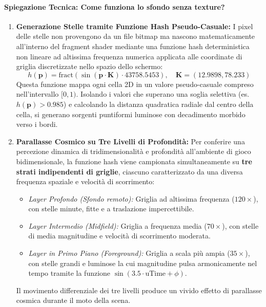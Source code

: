 \documentclass[11pt,a4paper]{article}
\begin{document}
\paragraph{Spiegazione Tecnica: Come funziona lo sfondo senza texture?}
\begin{enumerate}
    \item \textbf{Generazione Stelle tramite Funzione Hash Pseudo-Casuale:}
    I pixel delle stelle non provengono da un file bitmap ma nascono matematicamente all'interno del fragment shader mediante una funzione hash deterministica non lineare ad altissima frequenza numerica applicata alle coordinate di griglia discretizzate nello spazio dello schermo:
    \begin{equation}
    h(\mathbf{p}) = \text{fract}\left(\sin(\mathbf{p} \cdot \mathbf{K}) \cdot 43758.5453\right), \quad \mathbf{K} = (12.9898, 78.233)
    \end{equation}
    Questa funzione mappa ogni cella 2D in un valore pseudo-casuale compreso nell'intervallo $[0, 1)$. Isolando i valori che superano una soglia selettiva (es. $h(\mathbf{p}) > 0.985$) e calcolando la distanza quadratica radiale dal centro della cella, si generano sorgenti puntiformi luminose con decadimento morbido verso i bordi.
    
    \item \textbf{Parallasse Cosmico su Tre Livelli di Profondità:}
    Per conferire una percezione dinamica di tridimensionalità e profondità all'ambiente di gioco bidimensionale, la funzione hash viene campionata simultaneamente su \textbf{tre strati indipendenti di griglie}, ciascuno caratterizzato da una diversa frequenza spaziale e velocità di scorrimento:
    \begin{itemize}
        \item \textit{Layer Profondo (Sfondo remoto):} Griglia ad altissima frequenza ($120\times$), con stelle minute, fitte e a traslazione impercettibile.
        \item \textit{Layer Intermedio (Midfield):} Griglia a frequenza media ($70\times$), con stelle di media magnitudine e velocità di scorrimento moderata.
        \item \textit{Layer in Primo Piano (Foreground):} Griglia a scala più ampia ($35\times$), con stelle grandi e luminose la cui magnitudine pulsa armonicamente nel tempo tramite la funzione $\sin(3.5 \cdot \text{uTime} + \phi)$.
    \end{itemize}
    Il movimento differenziale dei tre livelli produce un vivido effetto di parallasse cosmica durante il moto della scena.


\end{enumerate}
\end{document}
